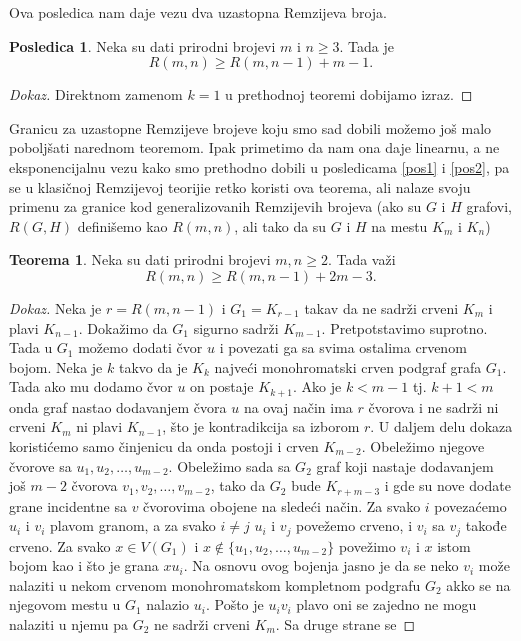 \documentclass{article}
\theoremstyle{definition}
\newtheorem{teorema}{Teorema}[section]
\newtheorem{posledica}{Posledica}[teorema]
\newcommand{\dokaz}[1]{\begin{proof}[Dokaz]#1\end{proof}}
\begin{document}
	Ova posledica nam daje vezu dva uzastopna Remzijeva broja.
	\begin{posledica}\label{pos3}
		Neka su dati prirodni brojevi $m$ i $n \geq 3$. Tada je
		$$R(m,n) \geq R(m, n - 1) + m - 1.$$
		\dokaz{
			Direktnom zamenom $k = 1$ u prethodnoj teoremi dobijamo izraz.
		}
	\end{posledica}
	Granicu za uzastopne Remzijeve brojeve koju smo sad dobili možemo još malo poboljšati narednom teoremom. Ipak primetimo da nam ona daje 			linearnu, a ne eksponencijalnu vezu kako smo prethodno dobili u posledicama \ref{pos1} i \ref{pos2}, pa se u klasičnoj Remzijevoj teorijie retko koristi 
	ova teorema,
	ali nalaze svoju primenu za granice kod generalizovanih Remzijevih brojeva (ako su $G$ i $H$ grafovi, $R(G,H)$ definišemo kao $R(m,n)$, ali tako da 			su $G$ i $H$ na mestu $K_m$ i $K_n$)
	\begin{teorema}\label{dot4}
		Neka su dati prirodni brojevi $m, n \geq 2$. Tada važi $$R(m,n) \geq R(m,n-1) + 2m - 3.$$
		\dokaz{
			Neka je $r = R(m, n - 1)$ i $G_1 = K_{r - 1}$ takav da ne sadrži crveni $K_m$ i plavi $K_{n-1}$. Dokažimo da $G_1$ sigurno sadrži $K_{m - 1}$.
			Pretpotstavimo suprotno. Tada u $G_1$ možemo dodati čvor $u$ i povezati ga sa svima ostalima crvenom bojom. Neka je $k$ takvo da je $K_k$
			najveći monohromatski crven podgraf grafa $G_1$. Tada ako mu dodamo čvor $u$ on postaje $K_{k + 1}$. Ako je $k < m - 1$ tj. $k + 1< m$ 				onda graf nastao dodavanjem čvora $u$ na ovaj način ima $r$ čvorova i ne sadrži ni crveni $K_m$ ni plavi $K_{n - 1}$, što je kontradikcija sa 				izborom $r$. \newline
			U daljem delu dokaza koristićemo samo činjenicu da onda postoji i crven $K_{m - 2}$. Obeležimo njegove čvorove sa $u_1, u_2, \dots,u_{m - 2}$.
			Obeležimo sada sa $G_2$ graf koji nastaje dodavanjem još $m - 2$ čvorova $v_1, v_2, \dots,v_{m - 2}$, tako da $G_2$ bude $K_{r + m - 3}$ i 
			gde su nove dodate grane incidentne sa $v$ čvorovima obojene na sledeći način.
			Za svako $i$ povezaćemo $u_i$ i $v_i$ plavom granom, a za svako $i \neq j$ $u_i$ i $v_j$ povežemo crveno, i $v_i$ sa $v_j$ takođe crveno.
			Za svako $x \in V(G_1)$ i $x \notin \{u_1, u_2, \dots,u_{m - 2}\}$ povežimo $v_i$ i $x$ istom bojom kao i što je grana $xu_i$. Na osnovu ovog 
			bojenja jasno je da se neko $v_i$ može nalaziti u nekom crvenom monohromatskom kompletnom podgrafu $G_2$ akko se na njegovom mestu
			u $G_1$ nalazio $u_i$. Pošto je $u_i v_i$ plavo oni se zajedno ne mogu nalaziti u njemu pa $G_2$ ne sadrži crveni $K_m$. Sa druge strane se
}
\end{teorema}
\end{document}
